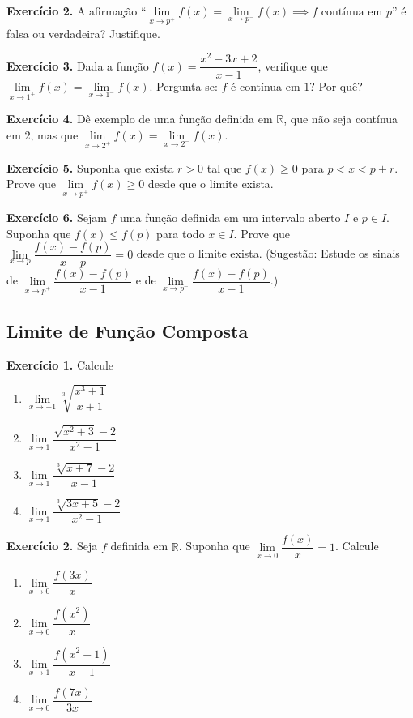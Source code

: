 \documentclass[12pt,a4paper]{article}
\begin{document}
\vspace{0.5cm}
\noindent\textbf{Exercício 2.}
A afirmação ``$\lim\limits_{x \to p^+} f(x) = \lim\limits_{x \to p^-} f(x) \implies f \text{ contínua em } p$'' é falsa ou verdadeira? Justifique.

\vspace{0.5cm}
\noindent\textbf{Exercício 3.}
Dada a função $f(x) = \dfrac{x^2 - 3x + 2}{x - 1}$, verifique que $\lim\limits_{x \to 1^+} f(x) = \lim\limits_{x \to 1^-} f(x)$. Pergunta-se: $f$ é contínua em $1$? Por quê?

\vspace{0.5cm}
\noindent\textbf{Exercício 4.}
Dê exemplo de uma função definida em $\mathbb{R}$, que não seja contínua em $2$, mas que $\lim\limits_{x \to 2^+} f(x) = \lim\limits_{x \to 2^-} f(x)$.

\vspace{0.5cm}
\noindent\textbf{Exercício 5.}
Suponha que exista $r > 0$ tal que $f(x) \ge 0$ para $p < x < p + r$. Prove que $\lim\limits_{x \to p^+} f(x) \ge 0$ desde que o limite exista.

\vspace{0.5cm}
\noindent\textbf{Exercício 6.}
Sejam $f$ uma função definida em um intervalo aberto $I$ e $p \in I$. Suponha que $f(x) \le f(p)$ para todo $x \in I$. Prove que $\lim\limits_{x \to p} \dfrac{f(x) - f(p)}{x - p} = 0$ desde que o limite exista.
(Sugestão: Estude os sinais de $\lim\limits_{x \to p^+} \dfrac{f(x) - f(p)}{x - 1}$ e de $\lim\limits_{x \to p^-} \dfrac{f(x) - f(p)}{x - 1}$.)

\subsection{Limite de Função Composta}
\vspace{0.5cm}
\noindent\textbf{Exercício 1.} Calcule
\begin{enumerate}
    \renewcommand{\theenumi}{\alph{enumi}}
    \renewcommand{\labelenumi}{\theenumi)}
    \item $\lim\limits_{x \to -1} \sqrt[3]{\dfrac{x^3 + 1}{x + 1}}$
    \item $\lim\limits_{x \to 1} \dfrac{\sqrt{x^2 + 3} - 2}{x^2 - 1}$
    \item $\lim\limits_{x \to 1} \dfrac{\sqrt[3]{x + 7} - 2}{x - 1}$
    \item $\lim\limits_{x \to 1} \dfrac{\sqrt[3]{3x + 5} - 2}{x^2 - 1}$
\end{enumerate}

\vspace{0.5cm}
\noindent\textbf{Exercício 2.} Seja $f$ definida em $\mathbb{R}$. Suponha que $\lim\limits_{x \to 0} \dfrac{f(x)}{x} = 1$. Calcule
\begin{enumerate}
    \renewcommand{\theenumi}{\alph{enumi}}
    \renewcommand{\labelenumi}{\theenumi)}
    \item $\lim\limits_{x \to 0} \dfrac{f(3x)}{x}$
    \item $\lim\limits_{x \to 0} \dfrac{f(x^2)}{x}$
    \item $\lim\limits_{x \to 1} \dfrac{f(x^2 - 1)}{x - 1}$
    \item $\lim\limits_{x \to 0} \dfrac{f(7x)}{3x}$
\end{enumerate}
\end{document}
